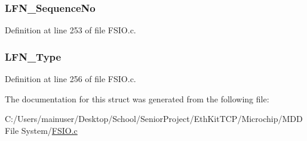 \subsubsection[{L\+F\+N\+\_\+\+Sequence\+No}]{ L\+F\+N\+\_\+\+Sequence\+No}\label{struct_l_f_n___e_n_t_r_y_ac72fdaed5dd9bab2b565f2641a640ed2}


Definition at line 253 of file F\+S\+I\+O.\+c.

\hypertarget{struct_l_f_n___e_n_t_r_y_a8218c90badac6db18f565dc25c5646f6}{}
\subsubsection[{L\+F\+N\+\_\+\+Type}]{ L\+F\+N\+\_\+\+Type}\label{struct_l_f_n___e_n_t_r_y_a8218c90badac6db18f565dc25c5646f6}


Definition at line 256 of file F\+S\+I\+O.\+c.



The documentation for this struct was generated from the following file\+:\begin{DoxyCompactItemize}
\item 
C\+:/\+Users/mainuser/\+Desktop/\+School/\+Senior\+Project/\+Eth\+Kit\+T\+C\+P/\+Microchip/\+M\+D\+D File System/\hyperlink{_f_s_i_o_8c}{F\+S\+I\+O.\+c}\end{DoxyCompactItemize}
